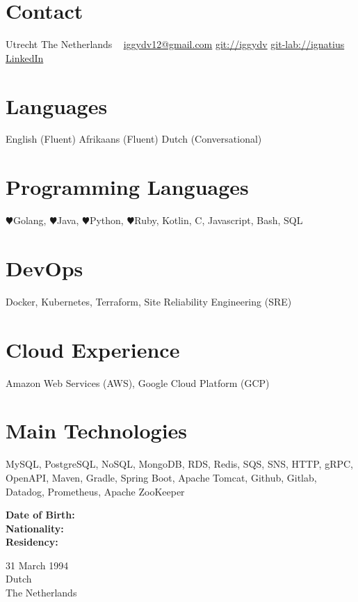\documentclass[10pt]{friggeri-cv} %
\begin{document}
\begin{aside} %
\section{Contact}
Utrecht
The Netherlands
~
\href{iggydv12@gmail.com}{iggydv12@gmail.com}
\href{https://github.com/iggydv}{git://iggydv} \faGithub
\href{https://gitlab.com/users/iggydv12/projects}{git-lab://ignatius} \faGitlab
\href{https://www.linkedin.com/in/ignatius-de-villiers-11324b133}{LinkedIn} \faLinkedin
\section{Languages}
English (Fluent)
Afrikaans (Fluent)
Dutch (Conversational)
\section{Programming Languages}
{\color{blue} $\varheartsuit$}Golang, {\color{purple} $\varheartsuit$}Java, {\color{green} $\varheartsuit$}Python, {\color{orange} $\varheartsuit$}Ruby, Kotlin, C, Javascript, Bash, SQL
\section{DevOps}
Docker, Kubernetes, Terraform, Site Reliability Engineering (SRE)
\section{Cloud Experience}
Amazon Web Services (AWS), Google Cloud Platform (GCP) 
\section{Main Technologies}
MySQL, PostgreSQL, NoSQL, MongoDB, RDS, Redis, SQS, SNS, HTTP, gRPC, OpenAPI, Maven, Gradle, Spring Boot, Apache Tomcat, Github, Gitlab, Datadog, Prometheus, Apache ZooKeeper
\end{aside}
\newline
\begin{minipage}[t]{0.2\textwidth}
    \textbf{Date of Birth:}\\
    \textbf{Nationality:}\\
    \textbf{Residency:}\\
\end{minipage}%
%
\begin{minipage}[t]{0.5\textwidth}
    31 March 1994\\
    Dutch\\
    The Netherlands
\end{minipage}%
\newline
\end{document}
